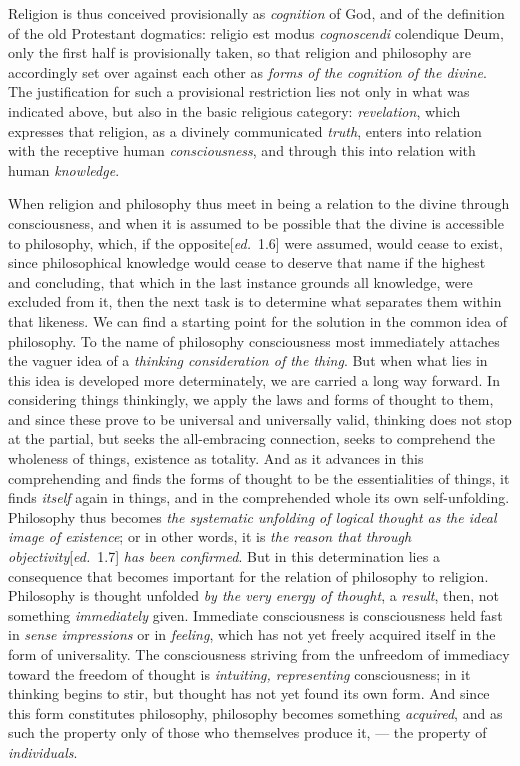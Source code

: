 \documentclass[12pt,a4paper,openany]{book}
\newcommand{\kpage}[1]{\marginnote{\footnotesize\textit{[#1]}}}
\newcommand{\ed}[1]{{\small[\textit{ed.}\ #1]}}
\begin{document}
Religion is thus conceived provisionally as \emph{cognition} of God, and of
the definition of the old Protestant dogmatics: religio est modus
\emph{cognoscendi} colendique Deum, only the first half is provisionally taken,
so that religion and philosophy are accordingly set over against each other
as \emph{forms of the cognition of the divine}. The justification for such a
\kpage{76}provisional restriction lies not only in what was indicated above,
but also in the basic religious category: \emph{revelation}, which
expresses that religion, as a divinely communicated \emph{truth},
enters into relation with the receptive human \emph{consciousness}, and through
this into relation with human \emph{knowledge}.

When religion and philosophy thus meet in being a relation
to the divine through consciousness, and when it is assumed
to be possible that the divine is accessible to philosophy,
which, if the opposite\ed{1.6} were assumed, would cease to exist,
since philosophical knowledge would cease to deserve that name
if the highest and concluding, that which in the last instance grounds
all knowledge, were excluded from it, then the next task is to
determine what separates them within that likeness. We can find a
starting point for the solution in the common idea of philosophy.
To the name of philosophy consciousness most immediately attaches
the vaguer idea of a \emph{thinking consideration of the thing}.
But when what lies in this idea is developed more determinately,
we are carried a long way forward. In considering things thinkingly,
we apply the laws and forms of thought to them, and since these
prove to be universal and universally valid, thinking does not stop
at the partial, but seeks the all-embracing connection,
seeks to comprehend the wholeness of things, existence as totality. And
as it advances in this comprehending and finds the forms of thought
to be the essentialities of things, it finds \emph{itself} again in things, and in the
comprehended whole its own self-unfolding. Philosophy thus becomes
\emph{the systematic unfolding of logical thought as the ideal image of existence};
or in other words, it is \emph{the reason that through objectivity}\ed{1.7} \emph{has been
confirmed}. But in this determination lies a consequence that becomes
important for the relation of philosophy to religion. Philosophy
is thought unfolded \emph{by the very energy of thought}, a \emph{result}, then,
not something \emph{immediately} given. Immediate consciousness is consciousness held fast
in \emph{sense impressions} or in \emph{feeling}, which has not yet
freely acquired itself in the form of universality. The consciousness striving from the unfreedom
of immediacy toward the freedom of thought
is \emph{intuiting, representing} consciousness; in it thinking begins
to stir, but thought has not yet found its own form. And
since this form constitutes philosophy, philosophy becomes something
\kpage{77}\emph{acquired}, and as such the property only of those who themselves produce
it, --- the property of \emph{individuals}.
\end{document}
